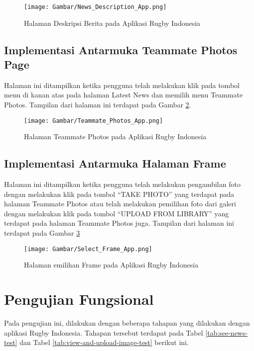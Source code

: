 \begin{figure} [H]
    \centering
    \texttt{[image: Gambar/News\_Description\_App.png]}
    \caption{Halaman Deskripsi Berita pada Aplikasi Rugby Indonesia}
    \label{fig:news-description-app}
\end{figure}

\subsection{Implementasi Antarmuka Teammate Photos Page}
Halaman ini ditampilkan ketika pengguna telah melakukan klik pada tombol menu di kanan atas pada halaman Latest News dan memilih menu Teammate Photos. Tampilan dari halaman ini terdapat pada Gambar \ref{fig:teammate-photos-app}.

\begin{figure} [H]
    \centering
    \texttt{[image: Gambar/Teammate\_Photos\_App.png]}
    \caption{Halaman Teammate Photos pada Aplikasi Rugby Indonesia}
    \label{fig:teammate-photos-app}
\end{figure}

\subsection{Implementasi Antarmuka Halaman Frame}
Halaman ini ditampilkan ketika pengguna telah melakukan pengambilan foto dengan melakukan klik pada tombol ``TAKE PHOTO'' yang terdapat pada halaman Teammate Photos atau telah melakukan pemilihan foto dari galeri dengan melakukan klik pada tombol ``UPLOAD FROM LIBRARY'' yang terdapat pada halaman Teammate Photos juga. Tampilan dari halaman ini terdapat pada Gambar \ref{fig:select-frame-app}

\begin{figure} [H]
    \centering
    \texttt{[image: Gambar/Select\_Frame\_App.png]}
    \caption{Halaman emilihan Frame pada Aplikasi Rugby Indonesia}
    \label{fig:select-frame-app}
\end{figure}

\section{Pengujian Fungsional}
Pada pengujian ini, dilakukan dengan beberapa tahapan yang dilakukan dengan aplikasi Rugby Indonesia. Tahapan tersebut terdapat pada Tabel \ref{tab:see-news-test} dan Tabel \ref{tab:view-and-upload-image-test} berikut ini.


